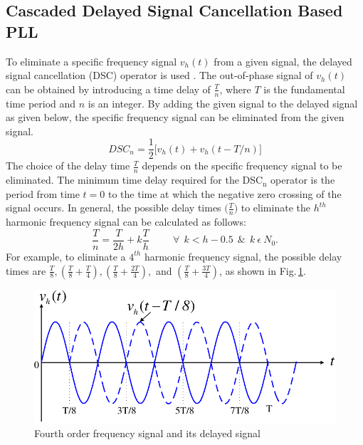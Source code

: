 \vspace*{-1cm}
\subsection{Cascaded Delayed Signal Cancellation Based PLL}
To eliminate a specific frequency signal $v_h(t)$ from a given signal, the delayed signal cancellation (DSC) operator is used \cite{5443553}. The out-of-phase signal of $v_h(t)$ can be obtained by introducing a time delay of $\frac{T}{n}$, where $T$ is the fundamental time period and $n$ is an integer. By adding the given signal to the delayed signal as given below, the specific frequency signal can be eliminated from the given signal.
\begin{equation*} \label{3.4}
DSC_{n} = \frac{1}{2} \big[ v_{h}(t) + v_{h} ( t-T/n ) \big]
\end{equation*}
The choice of the delay time $\frac{T}{n}$ depends on the specific frequency signal to be eliminated. The minimum time delay required for the DSC$_{\text{n}}$ operator is the period from time $t = 0$ to the time at which the negative zero crossing of the signal occurs. In general, the possible delay times $\big(\frac{T}{n}\big)$ to eliminate the $h^{th}$ harmonic frequency signal can be calculated as follows:
\begin{equation} \label{3.5}
\frac{T}{n} = \frac{T}{2h} + k\frac{T}{h} \hspace{1cm} \forall ~~ k < h-0.5 ~~\& ~~ k ~ \epsilon ~ N_{0}.
\end{equation}
For example, to eliminate a $4^{th}$ harmonic frequency signal, the possible delay times are $\frac{T}{8}, \left(\frac{T}{8} + \frac{T}{4}\right), \left(\frac{T}{8} + \frac{2T}{4}\right),$ and $\left(\frac{T}{8} + \frac{3T}{4}\right)$, as shown in Fig.\,\ref{fig3.6}.
\begin{figure}[h]  
	\centering
	\includegraphics[scale=0.7]{figures/Chapter_3/Mine/DSC.pdf}
	\caption{Fourth order frequency signal and its delayed signal}
	\label{fig3.6}
\end{figure} 

